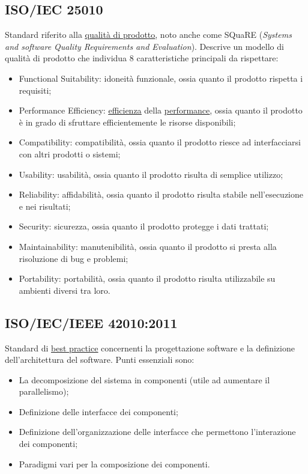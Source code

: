 	\subsection{ISO/IEC 25010}
	\label{sec:iso25010d}
	Standard riferito alla \underline{\hyperref[sec:qualitaprodotto]{qualità di prodotto}}, noto anche come SQuaRE (\emph{Systems and software Quality Requirements and Evaluation}). Descrive un modello di qualità di prodotto che individua 8 caratteristiche principali da rispettare: \begin{itemize}
	\item Functional Suitability: idoneità funzionale, ossia quanto il prodotto rispetta i requisiti;
	\item Performance Efficiency: \underline{\hyperref[sec:efficienza]{efficienza}} della \underline{\hyperref[sec:performance]{performance}}, ossia quanto il prodotto è in grado di sfruttare efficientemente le risorse disponibili;
	\item Compatibility: compatibilità, ossia quanto il prodotto riesce ad interfacciarsi con altri prodotti o sistemi; 
	\item Usability: usabilità, ossia quanto il prodotto risulta di semplice utilizzo;
	\item Reliability: affidabilità, ossia quanto il prodotto risulta stabile nell'esecuzione e nei risultati;
	\item Security: sicurezza, ossia quanto il prodotto protegge i dati trattati;
	\item Maintainability: manutenibilità, ossia quanto il prodotto si presta alla risoluzione di bug e problemi;
	\item Portability: portabilità, ossia quanto il prodotto risulta utilizzabile su ambienti diversi tra loro.
	\end{itemize}

	\subsection{ISO/IEC/IEEE 42010:2011}
	\label{sec:iso12207}
	Standard di \underline{\hyperref[sec:bestpractice]{best practice}} concernenti la progettazione software e la definizione dell'architettura del software. Punti essenziali sono:
	\begin{itemize}  
	\item La decomposizione del sistema in componenti (utile ad aumentare il parallelismo);
	\item Definizione delle interfacce dei componenti;
	\item Definizione dell'organizzazione delle interfacce che permettono l'interazione dei componenti;
	\item Paradigmi vari per la composizione dei componenti.
	\end{itemize}		

